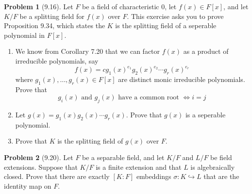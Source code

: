 \documentclass[12pt]{article}
\theoremstyle{definition}
\newtheorem{problem}{Problem}
\begin{document}
\begin{problem}[9.16]
    Let $F$ be a field of characteristic 0, let $f(x) \in F[x]$, and let $K/F$ be a splitting field for $f(x)$ over $F$.
    This exercise asks you to prove Proposition 9.34, which states the $K$ is the splitting field of a seperable polynomial in $F[x]$.
    \begin{enumerate}[label=(\alph*)]
        \item We know from Corollary 7.20 that we can factor $f(x)$ as a product of irreducible polynomials, say
              \[
                    f(x) = cg_1(x)^{e_1}g_2(x)^{e_2} \cdots g_r(x)^{e_r}
              \]
              where $g_1(x), \ldots, g_r(x) \in F[x]$ are distinct monic irreducible polynomials. Prove that
              \[
                g_i(x) \text{ and } g_j(x) \text{ have a common root } \iff i = j
              \]
        \begin{solution}

        \end{solution}

        \item Let $g(x) = g_1(x)g_2(x) \cdots g_r(x)$. Prove that $g(x)$ is a seperable polynomial.
        
        \begin{solution}

        \end{solution}

        \item Prove that $K$ is the splitting field of $g(x)$ over $F$. 
        
        \begin{solution}

        \end{solution}
    \end{enumerate}
\end{problem}

\begin{problem}[9.20]
    Let $F$ be a separable field, and let $K/F$ and $L/F$ be field extensions. 
    Suppose that $K/F$ is a finite extension and that $L$ is algebraically closed. 
    Prove that there are exactly $[K : F]$ embeddings $\sigma : K \hookrightarrow L$ that are the identity 
    map on $F$.

    \begin{solution}

    \end{solution}
\end{problem}
\end{document}
